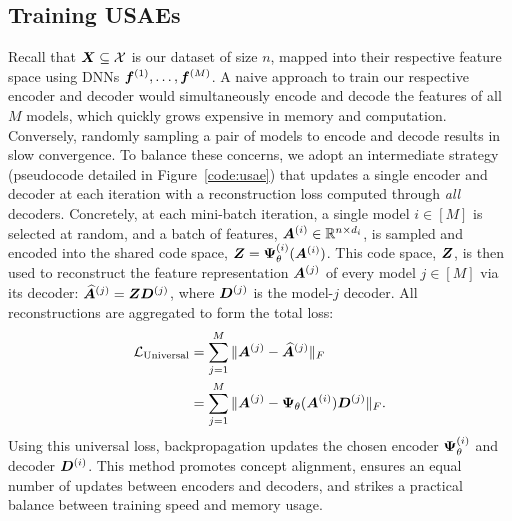 \subsection{Training USAEs}
\vspace{-1mm}
Recall that $\bm{X} \subseteq \mathcal{X}$ is our dataset of size $n$, mapped into their respective feature space using DNNs $\bm{f}^{(1)}, \ldots, \bm{f}^{(M)}$. A naive approach to train our respective encoder and decoder would simultaneously encode and decode the features of all $M$ models, which quickly grows expensive in memory and computation. 
Conversely, randomly sampling a pair of models to encode and decode results in slow convergence. To balance these concerns, we adopt an intermediate strategy (pseudocode detailed in Figure~\ref{code:usae}) that updates a single encoder and decoder at each iteration with a reconstruction loss computed through \emph{all} decoders. Concretely, at each mini-batch iteration, a single model $i \in [M]$ is selected at random, and a batch of features, $\bm{A}^{(i)} \in \mathbb{R}^{n \times d_i}$, is sampled and encoded into the shared code space, $\bm{Z} = \bm{\Psi}_{\theta}^{(i)}(\bm{A}^{(i)})$.
This code space, $\bm{Z}$, is then used to reconstruct the feature representation $\bm{A}^{(j)}$ of every model $j \in [M]$ via its decoder:
$\widehat{\bm{A}}^{(j)} = \bm{Z} \bm{D}^{(j)}$,
where $\bm{D}^{(j)}$ is the model-$j$ decoder. All reconstructions are aggregated to form the total loss:
\vspace{-2mm}
\begin{align}
\mathcal{L}_{\text{Universal}} &= \sum_{j=1}^M \|\bm{A}^{(j)} - \widehat{\bm{A}}^{(j)}\|_F \\
&= \sum_{j=1}^M \|\bm{A}^{(j)} - \bm{\Psi}_{\theta}(\bm{A}^{(i)})\bm{D}^{(j)} \|_F.
\end{align}
Using this universal loss, backpropagation updates the chosen encoder $\bm{\Psi}_{\theta}^{(i)}$ and decoder $\bm{D}^{(i)}$. This method promotes concept alignment, ensures an equal number of updates between encoders and decoders, and strikes a practical balance between training speed and memory usage.



